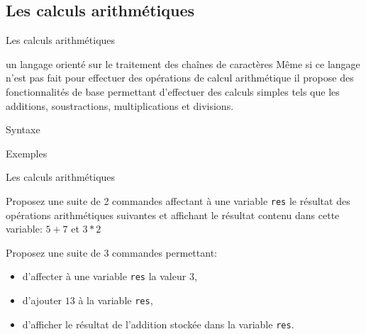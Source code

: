 \subsection{Les calculs arithmétiques}
\begin{frame}{Les calculs arithmétiques}
	\begin{alertblock}{ un langage orienté sur le traitement des chaînes de caractères}
		Même si ce langage n'est pas fait pour effectuer des opérations de calcul arithmétique il propose des fonctionnalités de base permettant d'effectuer des calculs simples tels que les additions, soustractions, multiplications et divisions. 
	\end{alertblock}
	\begin{block}{Syntaxe}
		\begin{center}
		\end{center}
	\end{block}
	\begin{block}{Exemples}
		\begin{center}
			\tiny{%
			}
		\end{center}
	\end{block}
\end{frame}

\begin{exercice}
  \begin{exercicelet}{Les calculs arithmétiques}
    \begin{questions}
    \item Proposez une suite de 2 commandes affectant à une variable \texttt{res} le résultat des opérations arithmétiques suivantes et affichant le résultat contenu dans cette variable: $5 + 7$ et $3 * 2$
	\item Proposez une suite de 3 commandes permettant:
	\begin{itemize}
		\item d'affecter à une variable \texttt{res} la valeur $3$,
		\item d'ajouter $13$ à la variable \texttt{res},
		\item d'afficher le résultat de l'addition stockée dans la variable \texttt{res}.
	\end{itemize}


    \end{questions}
  \end{exercicelet}
\end{exercice}

